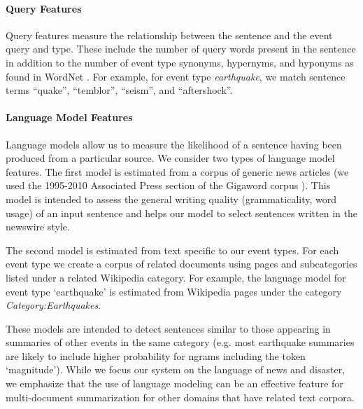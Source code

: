 \paragraph{Query Features}

Query features measure the relationship between the sentence and the event query and type.  These include the number of query words present in the sentence in addition to the number of event type synonyms, hypernyms, and hyponyms as found in WordNet \cite{miller1995wordnet}.  
For example, for event type \emph{earthquake},  we match sentence terms 
``quake'', ``temblor'', ``seism'', and ``aftershock''.

\paragraph{Language Model Features}\label{subsubsec:lm}
Language models allow us to measure the likelihood of a sentence having been 
produced from a particular source.  We consider two types of language model 
features.  The first model is estimated from a corpus of generic news 
articles (we used the 1995-2010 Associated Press section of the 
Gigaword corpus \cite{graff2003english}).  
This model is intended to assess the general writing quality (grammaticality, word usage) of an input sentence and helps our model to select sentences
written in the newswire style.  

The second model is estimated from text specific to our event types.  
For each event type we create a corpus of related documents using pages
and subcategories listed under a related Wikipedia category.
For example, the language model for event type `earthquake' is estimated 
from Wikipedia pages under the category \emph{Category:Earthquakes}.  



These models are intended to detect sentences similar to those appearing in 
summaries of other events in the same category 
(e.g. most earthquake summaries are likely to include higher probability for 
ngrams including the token `magnitude'). While we focus our system on the 
language of news and disaster, we emphasize that the use of language modeling 
can be an effective feature for multi-document summarization for other 
domains that have related text corpora.




